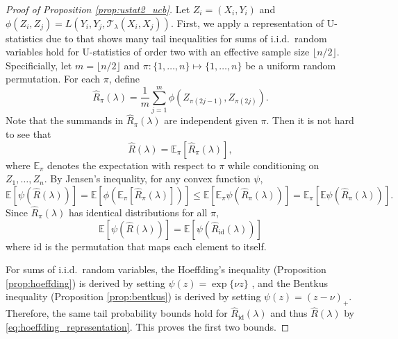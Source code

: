 \documentclass[10pt]{article}
\def\E{\mathbb{E}}
\newcommand{\T}{\mathcal{T}}
\newcommand{\Rhat}{\widehat{R}}
\begin{document}
\begin{proof}[Proof of Proposition \ref{prop:ustat2_ucb}]
Let $Z_i = (X_i, Y_i)$ and $\phi(Z_i, Z_j) = L(Y_i, Y_j, \T_\lambda(X_i, X_j))$. First, we apply a representation of U-statistics due to \cite{hoeffding1963} that shows many tail inequalities for sums of i.i.d.\ random variables hold for U-statistics of order two with an effective sample size $\lfloor n / 2\rfloor$. Specificially, let $m = \lfloor n / 2\rfloor$ and $\pi: \{1, \ldots, n\}\mapsto \{1, \ldots, n\}$ be a uniform random permutation. For each $\pi$, define 
 \[\Rhat_{\pi}(\lambda) = \frac{1}{m}\sum_{j=1}^{m}\phi\left( Z_{\pi(2j-1)}, Z_{\pi(2j)}\right).\]
 Note that the summands in $\Rhat_{\pi}(\lambda)$ are independent given $\pi$. Then it is not hard to see that
 \[\Rhat(\lambda) = \E_{\pi}[\Rhat_{\pi}(\lambda)],\]
where $\E_{\pi}$ denotes the expectation with respect to $\pi$ while conditioning on $Z_1, \ldots, Z_n$. By Jensen's inequality, for any convex function $\psi$,
\[\E[\psi(\Rhat(\lambda))] = \E[\phi(\E_{\pi}[\Rhat_{\pi}(\lambda)])]\le \E[\E_{\pi}\psi(\Rhat_{\pi}(\lambda))] = \E_{\pi}[\E \psi(\Rhat_{\pi}(\lambda))].\]
Since $\Rhat_{\pi}(\lambda)$ has identical distributions for all $\pi$,
\begin{equation}
  \label{eq:hoeffding_representation}
  \E[\psi(\Rhat(\lambda))] = \E[\psi(\Rhat_{\mathrm{id}}(\lambda))]
\end{equation}
where $\mathrm{id}$ is the permutation that maps each element to itself. 

For sums of i.i.d.\ random variables, the Hoeffding's inequality (Proposition \ref{prop:hoeffding}) is derived by setting $\psi(z) = \exp\{\nu z\}$ \citep{hoeffding1963}, and the Bentkus inequality (Proposition \ref{prop:bentkus}) is derived by setting $\psi(z) = (z - \nu)_{+}$. Therefore, the same tail probability bounds hold for $\Rhat_{\mathrm{id}}(\lambda)$ and thus $\Rhat(\lambda)$ by \eqref{eq:hoeffding_representation}. This proves the first two bounds. 


\end{proof}
\end{document}
